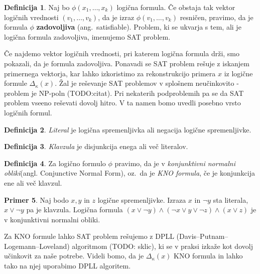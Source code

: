\documentclass[12pt,a4paper,twoside]{article}
\theoremstyle{definition} %
\newtheorem{definicija}{Definicija}[section]
\newtheorem{primer}[definicija]{Primer}
\theoremstyle{plain} %
\numberwithin{equation}{section}  %
\begin{document}
\begin{definicija}
	Naj bo $\phi(x_1,\ldots,x_k)$ logična formula.
	Če obstaja tak vektor logičnih vrednosti $(v_1, \ldots, v_k)$, da je izraz $\phi(v_1, \ldots, v_k)$ resničen,
	pravimo, da je formula $\phi$ \textbf{zadovoljiva} (ang.~satisfiable).
	Problem, ki se ukvarja s tem, ali je logična formula zadovoljiva, imenujemo SAT problem. %
\end{definicija}
Če najdemo vektor logičnih vrednosti, pri katerem logična formula drži, smo pokazali, da je formula zadovoljiva.
Ponavadi se SAT problem rešuje z iskanjem primernega vektorja, kar lahko izkoristimo za rekonstrukcijo primera $x$ iz logične formule $\Delta_{\kappa}(x)$.
Žal je reševanje SAT problemov v splošnem neučinkovito - problem je NP-poln (TODO:citat).
Pri nekaterih podproblemih pa se da SAT problem vseeno reševati dovolj hitro. %
V ta namen bomo uvedli posebno vrsto logičnih formul.

\begin{definicija}
	\emph{Literal} je logična spremenljivka ali negacija logične spremenljivke.
\end{definicija}

\begin{definicija}
	\emph{Klavzula} je disjunkcija enega ali več literalov.
\end{definicija}

\begin{definicija}
	Za logično formulo $\phi$ pravimo, da je v \emph{konjunktivni normalni obliki}(angl. Conjunctive Normal Form), 
	oz.~da je \emph{KNO formula}, če je konjunkcija ene ali več klavzul.
\end{definicija}

\begin{primer}
	Naj bodo $x,y$ in $z$ logične spremenljivke. Izraza $x$ in $\lnot y$ sta literala, $x \lor \lnot y$ pa je klavzula.
	Logična formula $(x \lor \lnot y) \land (\lnot x \lor y \lor \lnot z) \land (x \lor z)$ je v konjunktivni normalni obliki.
\end{primer}

Za KNO formule lahko SAT problem rešujemo z DPLL (Da\-vis--\-Put\-nam--\-Lo\-ge\-mann--\-Lo\-ve\-la\-nd) algoritmom (TODO: sklic), ki se v praksi izkaže kot dovolj učinkovit za naše potrebe.
Videli bomo, da je $\Delta_{\kappa}(x)$ KNO formula in lahko tako na njej uporabimo DPLL algoritem.
\end{document}
